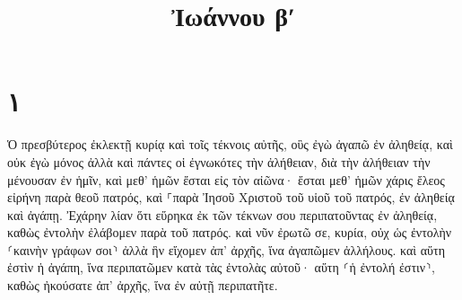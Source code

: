\documentclass{openreader}
\title{Ἰωάννου βʹ}
\date{}
\begin{document}
\maketitle
\raggedbottom 
\fontsize{16pt}{24pt}\selectfont
\section*{۱}
Ὁ πρεσβύτερος ἐκλεκτῇ κυρίᾳ καὶ τοῖς τέκνοις αὐτῆς, οὓς ἐγὼ ἀγαπῶ ἐν ἀληθείᾳ, καὶ οὐκ ἐγὼ μόνος ἀλλὰ καὶ πάντες οἱ ἐγνωκότες τὴν ἀλήθειαν, διὰ τὴν ἀλήθειαν τὴν μένουσαν ἐν ἡμῖν, καὶ μεθ’ ἡμῶν ἔσται εἰς τὸν αἰῶνα· ἔσται μεθ’ ἡμῶν χάρις ἔλεος εἰρήνη παρὰ θεοῦ πατρός, καὶ ⸀παρὰ Ἰησοῦ Χριστοῦ τοῦ υἱοῦ τοῦ πατρός, ἐν ἀληθείᾳ καὶ ἀγάπῃ. Ἐχάρην λίαν ὅτι εὕρηκα ἐκ τῶν τέκνων σου περιπατοῦντας ἐν ἀληθείᾳ, καθὼς ἐντολὴν ἐλάβομεν παρὰ τοῦ πατρός. καὶ νῦν ἐρωτῶ σε, κυρία, οὐχ ὡς ἐντολὴν ⸂καινὴν γράφων σοι⸃ ἀλλὰ ἣν εἴχομεν ἀπ’ ἀρχῆς, ἵνα ἀγαπῶμεν ἀλλήλους. καὶ αὕτη ἐστὶν ἡ ἀγάπη, ἵνα περιπατῶμεν κατὰ τὰς ἐντολὰς αὐτοῦ· αὕτη ⸂ἡ ἐντολή ἐστιν⸃, καθὼς ἠκούσατε ἀπ’ ἀρχῆς, ἵνα ἐν αὐτῇ περιπατῆτε. 
\end{document}
